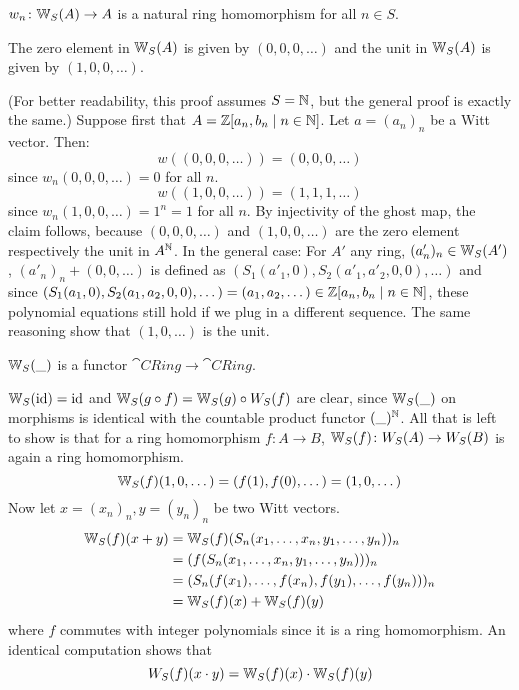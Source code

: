 \begin{cor} \label{cor: ghost components are nat trafos}
    $w_n \colon \mathbb{W}_S(A) \to A$ is a natural ring homomorphism for all $n \in S$.
\end{cor}
\begin{lemma}
    The zero element in $\mathbb{W}_S(A)$ is given by $(0,0,0,\dots)$ and the
    unit in $\mathbb{W}_S(A)$ is given by $(1,0,0,\dots)$.
\end{lemma}
\begin{beweis}
    (For better readability, this proof assumes $S = \mathbb{N}$, but the general proof is exactly the same.)
    Suppose first that $A = \mathbb{Z}[a_n, b_n \mid n \in \mathbb{N}]$. Let $a = (a_n)_n$ be a Witt vector.
    Then:
    \[
       w((0,0,0,\dots)) = (0,0,0,\dots) 
    \]
    since $w_n(0,0,0,\dots) = 0$ for all $n$.
    \[
        w((1,0,0,\dots)) = (1,1,1,\dots)
    \] 
    since $w_n(1,0,0,\dots) = 1^n = 1$ for all $n$.
    By injectivity of the ghost map, the claim follows, because $(0,0,0,\dots)$
    and $(1,0,0,\dots)$ are the zero element respectively the unit in $A^{\mathbb{N}}$.
    In the general case: For $A'$ any ring, $(a'_n)_n \in \mathbb{W}_S(A')$,
    $(a'_n)_n + (0,0,\dots)$ is defined as $(S_1(a'_1,0),S_2(a'_1,a'_2,0,0),\dots)$
    and since $(S_1(a_1,0),S_2(a_1,a_2,0,0),\dots) = (a_1,a_2,\dots) \in \mathbb{Z}[a_n,b_n \mid n \in \mathbb{N}]$,
    these polynomial equations still hold if we plug in a different sequence. The
    same reasoning show that $(1,0,\dots)$ is the unit.
\end{beweis}
\begin{proposition} \label{prop: W is a functor}
    $\mathbb{W}_S(\_)$ is a functor $\cat{CRing} \to \cat{CRing}$.
\end{proposition}
\begin{beweis}
$\mathbb{W}_S(\operatorname{id}) = \operatorname{id}$ and $\mathbb{W}_S(g \circ f) = \mathbb{W}_S(g) \circ W_S(f)$
are clear, since $\mathbb{W}_S(\_)$ on morphisms is identical with the countable product
functor $(\_)^{\mathbb{N}}$. All that is left to show is that for a ring homomorphism
$f\colon A \to B$, $\mathbb{W}_S(f) \colon W_S(A) \to W_S(B)$ is again 
a ring homomorphism.
\[
    \mathbb{W}_S(f)(1,0,\dots) = (f(1),f(0),\dots) = (1,0,\dots)
\]
Now let $x = (x_n)_n, y = (y_n)_n$ be two Witt vectors.
\begin{align*}
    \mathbb{W}_S(f)(x+y) &= \mathbb{W}_S(f)(S_n(x_1,\dots,x_n,y_1,\dots,y_n))_n \\
    &= (f(S_n(x_1,\dots,x_n,y_1,\dots,y_n)))_n \\
    &= (S_n(f(x_1),\dots,f(x_n),f(y_1),\dots,f(y_n)))_n \\
    &= \mathbb{W}_S(f)(x) + \mathbb{W}_S(f)(y)
\end{align*}
where $f$ commutes with integer polynomials since it is a ring homomorphism.
An identical computation shows that
\[
    W_S(f)(x \cdot y) = \mathbb{W}_S(f)(x) \cdot \mathbb{W}_S(f)(y)
\]
\end{beweis}

